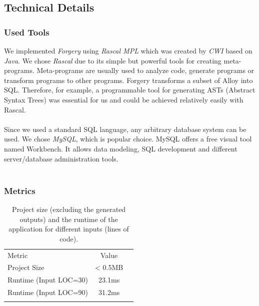 \documentclass[oneside]{book}
\renewcommand\arraystretch{1.3}
\begin{document}
\newpage

\subsection{Technical Details}

\subsubsection{Used Tools}
We implemented \textit{Forgery} using \textit{Rascal MPL} which was created by \textit{CWI} based on \textit{Java}. We chose \textit{Rascal} due to its simple but powerful tools for creating meta-programs. Meta-programs are usually used to analyze code, generate programs or transform programs to other programs. Forgery transforms a subset of Alloy into SQL. Therefore, for example, a programmable tool for generating ASTs (Abstract Syntax Trees) was essential for us and could be achieved relatively easily with Rascal.
\\\\
Since we used a standard SQL language, any arbitrary database system can be used. We chose \textit{MySQL}, which is popular choice. MySQL offers a free visual tool named Workbench. It allows data modeling, SQL development and different server/database administration tools.
\\\\
\subsubsection{Metrics}

\def\arraystretch{1.5}%
\begin{table}[h!]
  \label{tab:table1}
  \begin{tabular}{|l||c|c|}
  \hhline{-|-|-|}
    Metric & Value\\
    \hhline{|=|=|=|}
    Project Size & < 0.5MB \\
    \hhline{-|-|-|}
    Runtime (Input LOC=30) & 23.1ms \\
    \hhline{-|-|-|}
    Runtime (Input LOC=90) & 31.2ms \\
    \hhline{-|-|-|}
  \end{tabular}
   \centering
	\caption{Project size (excluding the generated outputs) and the runtime of the application for different inputs (lines of code).}
\end{table}
\end{document}
